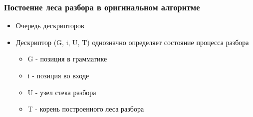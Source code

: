 \documentclass{beamer}
\begin{document}
	\begin{frame} 
		\frametitle{Постоение леса разбора в оригинальном алгоритме}
		\begin{itemize}
			\item Очередь дескрипторов
			\item Дескриптор (G, i, U, T) однозначно определяет состояние процесса разбора
			\begin{itemize}
				\item G - позиция в грамматике
				\item i - позиция во входе
				\item U - узел стека разбора
				\item T - корень построенного леса разбора
			\end{itemize}
		\end{itemize}
	\end{frame}
\end{document}
